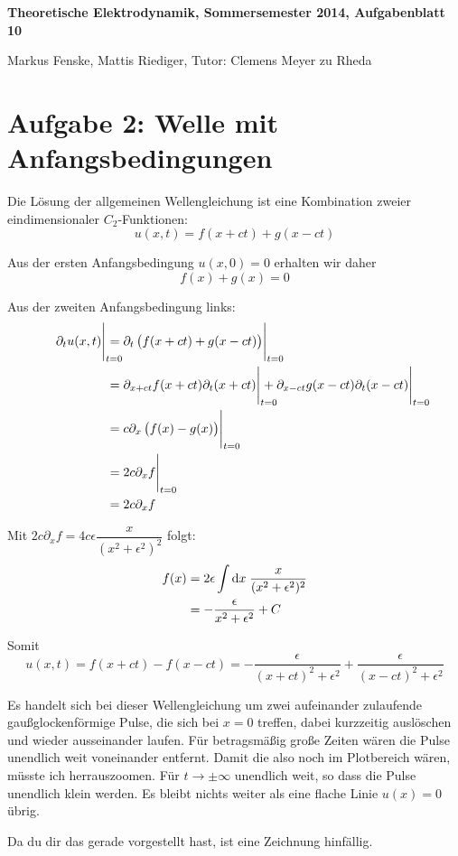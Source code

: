 \documentclass[a4paper,german,12pt,smallheadings]{scrartcl}
\begin{document}
\allowdisplaybreaks %
\begin{center}
\bfseries %
\sffamily %
\vspace{-40pt}
Theoretische Elektrodynamik, Sommersemester 2014, Aufgabenblatt 10

Markus Fenske, Mattis Riediger, Tutor: Clemens Meyer zu Rheda
\vspace{-10pt}
\end{center}

\section*{Aufgabe 2: Welle mit Anfangsbedingungen}
Die Lösung der allgemeinen Wellengleichung ist eine Kombination zweier eindimensionaler $C_2$-Funktionen:
\begin{equation}
  u(x,t) = f(x+ct) + g(x-ct)
\end{equation}

Aus der ersten Anfangsbedingung $u(x,0) = 0$ erhalten wir daher
\begin{equation}
  f(x) + g(x) = 0
\end{equation}

Aus der zweiten Anfangsbedingung links:
\begin{align}
 \eval{\partial_t u(x,t)}_{\mathrlap{t=0}} 
 &= \eval{\partial_t \del{f(x+ct) + g(x-ct)}}_{t=0} \\
 &= \eval{\partial_{x+ct} f(x+ct) \partial_{t} (x+ct)}_{\mathrlap{t=0}} +
    \eval{\partial_{x-ct} g(x-ct) \partial_{t} (x-ct)}_{\mathrlap{t=0}} \\
 &= \eval{c \partial_x \del{f(x) - g(x)}}_{t=0} \\
 &= \eval{2c \partial_x f}_{t=0} \\
 &= 2c \partial_x f
\end{align}

Mit $2c \partial_x f = 4c \epsilon \dfrac{x}{(x^2+\epsilon^2)^2}$ folgt:
\begin{align}
  f(x)
  &= 2 \epsilon \int \dif x \; \frac{x}{(x^2+\epsilon^2)^2} \\
  &= -\frac{\epsilon}{x^2 + \epsilon^2} + C
\end{align}

Somit
\begin{equation}
  u(x,t) = f(x+ct) - f(x-ct) = -\frac{\epsilon}{(x+ct)^2 + \epsilon^2} + \frac{\epsilon}{(x-ct)^2 + \epsilon^2}
\end{equation}

Es handelt sich bei dieser Wellengleichung um zwei aufeinander zulaufende
gaußglockenförmige Pulse, die sich bei $x=0$ treffen, dabei kurzzeitig
auslöschen und wieder ausseinander laufen. Für betragsmäßig große Zeiten wären
die Pulse unendlich weit voneinander entfernt. Damit die also noch im
Plotbereich wären, müsste ich herrauszoomen. Für $t \to \pm \infty$ unendlich
weit, so dass die Pulse unendlich klein werden. Es bleibt nichts weiter als
eine flache Linie $u(x) = 0$ übrig.

Da du dir das gerade vorgestellt hast, ist eine Zeichnung hinfällig.
\end{document}
